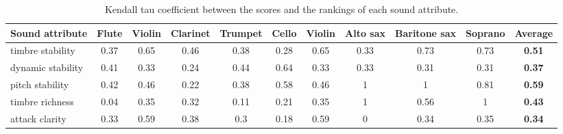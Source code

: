 \documentclass{article}
\begin{document}
\begin{table}[ht]
\centering
\begin{tabular}{lcccccccccc}
\hline
\textbf{Sound attribute} & \multicolumn{1}{l}{Flute} & \multicolumn{1}{l}{Violin} & \multicolumn{1}{l}{Clarinet} & \multicolumn{1}{l}{Trumpet} & \multicolumn{1}{l}{Cello} & \multicolumn{1}{l}{Violin} & \multicolumn{1}{l}{Alto sax} & \multicolumn{1}{l}{Baritone sax} & \multicolumn{1}{l}{Soprano} & \multicolumn{1}{l}{\textbf{Average}} \\ \hline
timbre stability         & 0.37                      & 0.65                       & 0.46                         & 0.38                        & 0.28                      & 0.65                       & 0.33                         & 0.73                             & 0.73                        & \textbf{0.51}                        \\
dynamic stability        & 0.41                      & 0.33                       & 0.24                         & 0.44                        & 0.64                      & 0.33                       & 0.33                         & 0.31                             & 0.31                        & \textbf{0.37}                        \\
pitch stability          & 0.42                      & 0.46                       & 0.22                         & 0.38                        & 0.58                      & 0.46                       & 1                            & 1                                & 0.81                        & \textbf{0.59}                        \\
timbre richness          & 0.04                      & 0.35                       & 0.32                         & 0.11                        & 0.21                      & 0.35                       & 1                            & 0.56                             & 1                           & \textbf{0.43}                        \\
attack clarity           & 0.33                      & 0.59                       & 0.38                         & 0.3                         & 0.18                      & 0.59                       & 0                            & 0.34                             & 0.35                        & \textbf{0.34}                        \\ \hline
\end{tabular}
\label{tau}
\caption{Kendall tau coefficient between the scores and the rankings of each sound attribute.}
\end{table}
\end{document}
